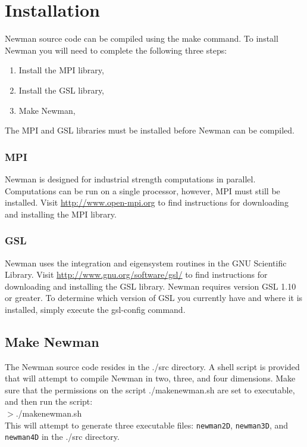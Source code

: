 \documentclass[11pt]{article}
\begin{document}
\section{Installation}

Newman source code can be compiled using the make command.  To install Newman you will need to complete the following three steps:
\begin{enumerate} 
\item Install the MPI library,
\item Install the GSL library,
\item Make Newman,
\end{enumerate} 
The MPI and GSL libraries must be installed before Newman can be compiled.

\subsubsection{MPI}
Newman is designed for industrial strength computations in parallel.  Computations can be run on a single processor, however, MPI must still be installed.  Visit \url{http://www.open-mpi.org} to find instructions for downloading and installing the MPI library.

\subsubsection{GSL}
Newman uses the integration and eigensystem routines in the GNU Scientific Library.  Visit \url{http://www.gnu.org/software/gsl/} to find instructions for downloading and installing the GSL library.  Newman requires version GSL 1.10 or greater.  To determine which version of GSL you currently have and where it is installed, simply execute the gsl-config command.

\subsection{Make Newman}
The Newman source code resides in the ./src directory.  A shell script is provided that will attempt to compile Newman in two, three, and four dimensions.  Make sure that the permissions on the script ./makenewman.sh are set to executable, and then run the script:\\

\noindent$>$./makenewman.sh\\

\noindent This will attempt to generate three executable files: \texttt{newman2D}, \texttt{newman3D}, and \texttt{newman4D} in the ./src directory.
\end{document}
